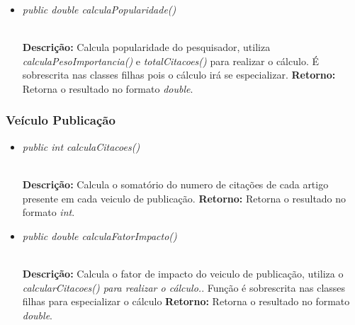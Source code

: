 \documentclass[12pt]{article}
\begin{document}
\vspace{0.2 true cm}

\begin{itemize}
 \item \begin{large}\textit{public double calculaPopularidade()}\end{large}\\
 \subitem \textbf{Descrição:} Calcula popularidade do pesquisador, utiliza \textit{calculaPesoImportancia()} e \textit{totalCitacoes()} para realizar o cálculo. É sobrescrita nas classes filhas pois o cálculo irá se especializar.
 \subitem \textbf{Retorno:} Retorna o resultado no formato \textit{double}.
\end{itemize}

\vspace{0.2 true cm}

\subsubsection{Veículo Publicação}

\begin{itemize}
 \item \begin{large}\textit{public int calculaCitacoes()}\end{large}\\
 \subitem \textbf{Descrição:} Calcula o somatório do numero de citações de cada artigo presente em cada veiculo de publicação.
 \subitem \textbf{Retorno:} Retorna o resultado no formato \textit{int}.
\end{itemize}

\vspace{0.2 true cm}

\begin{itemize}
 \item \begin{large}\textit{public double calculaFatorImpacto()}\end{large}\\
 \subitem \textbf{Descrição:} Calcula o fator de impacto do veiculo de publicação, utiliza o \textit{calcularCitacoes() para realizar o cálculo.}. Função é sobrescrita nas classes filhas para especializar o cálculo
 \subitem \textbf{Retorno:} Retorna o resultado no formato \textit{double}.
\end{itemize}

\vspace{0.2 true cm}
\end{document}

